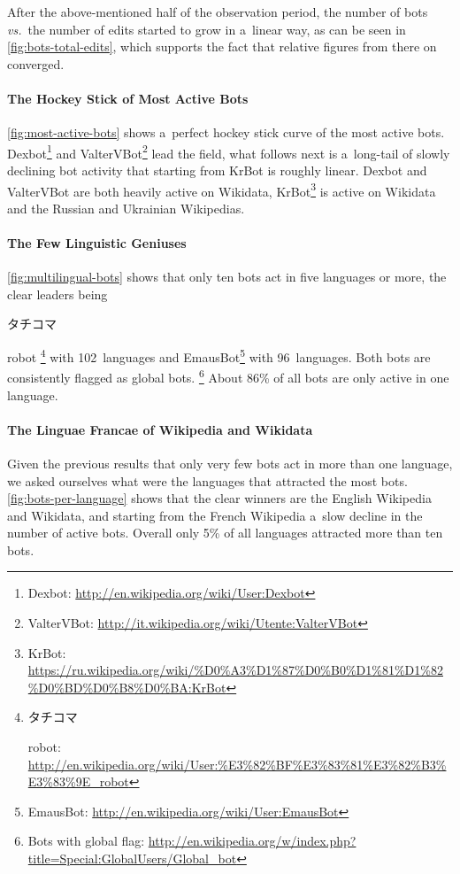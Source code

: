 \documentclass{sig-alternate}
\newcommand{\inlinelistingsize}{\fontsize{8pt}{11pt}}
\let\oldurl\url
\renewcommand{\url}[1]{\inlinelistingsize\oldurl{#1}}
\begin{document}
After the above-mentioned half of the observation period,
the number of bots \emph{vs.}\ the number of edits
started to grow in a~linear way, as can be seen in \autoref{fig:bots-total-edits}, which supports the fact that
relative figures from there on converged.

\paragraph{The Hockey Stick of Most Active Bots}

\autoref{fig:most-active-bots} shows a~perfect hockey stick
curve of the most active bots.
Dexbot\footnote{Dexbot: \url{http://en.wikipedia.org/wiki/User:Dexbot}}
and ValterVBot\footnote{ValterVBot: \url{http://it.wikipedia.org/wiki/Utente:ValterVBot}} lead the field,
what follows next is a~long-tail of slowly declining bot activity
that starting from KrBot is roughly linear.
Dexbot and ValterVBot are both heavily active on Wikidata,
KrBot\footnote{KrBot: \url{https://ru.wikipedia.org/wiki/\%D0\%A3\%D1\%87\%D0\%B0\%D1\%81\%D1\%82\%D0\%BD\%D0\%B8\%D0\%BA:KrBot}}
is active on Wikidata and the Russian and Ukrainian Wikipedias.

\paragraph{The Few Linguistic Geniuses}

\autoref{fig:multilingual-bots} shows that only ten bots
act in five languages or more, the clear leaders
being \begin{CJK}{UTF8}{min}タチコマ\end{CJK} robot%
\footnote{\begin{CJK}{UTF8}{min}タチコマ\end{CJK} robot:
\url{http://en.wikipedia.org/wiki/User:\%E3\%82\%BF\%E3\%83\%81\%E3\%82\%B3\%E3\%83\%9E_robot}} with 102~languages and
EmausBot\footnote{EmausBot:
\url{http://en.wikipedia.org/wiki/User:EmausBot}}
with 96~languages.
Both bots are consistently flagged as global bots.%
\footnote{Bots with global flag: \url{http://en.wikipedia.org/w/index.php?title=Special:GlobalUsers/Global_bot}}
About 86\% of all bots are only active in one language.

\paragraph{The Linguae Francae of Wikipedia and Wikidata}

Given the previous results that only very few bots
act in more than one language, we asked ourselves
what were the languages that attracted the most bots.
\autoref{fig:bots-per-language} shows that the clear winners
are the English Wikipedia and Wikidata,
and starting from the French Wikipedia a~slow decline
in the number of active bots.
Overall only 5\% of all languages attracted more than ten bots.
\end{document}
